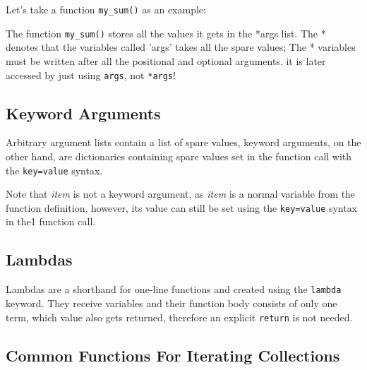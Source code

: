     Let's take a function \texttt{my_sum()} as an example:


    The function \texttt{my_sum()} stores all the values it gets in the *args list.
    The * denotes that the variables called 'args' takes all the spare values; The * variables must
    be written after all the positional and optional arguments.
    it is later accessed by just using \texttt{args}, not \texttt{*args}!
  
  \subsection{Keyword Arguments}
    Arbitrary argument lists contain a list of spare values, keyword arguments, on the other hand,
    are dictionaries containing spare values set in the function call with the
    \texttt{key=value} syntax.


    Note that \textit{item} is not a keyword argument, as \textit{item} is a normal variable
    from the function definition, however, its value can still be set using the
    \texttt{key=value} syntax in the1 function call.
    

  
  \subsection{Lambdas}
    Lambdas are a shorthand for one-line functions and created using the
    \texttt{lambda} keyword. They receive variables and their function body consists
    of only one term, which value also gets returned, therefore an explicit
    \texttt{return} is not needed.


  \subsection{Common Functions For Iterating Collections}